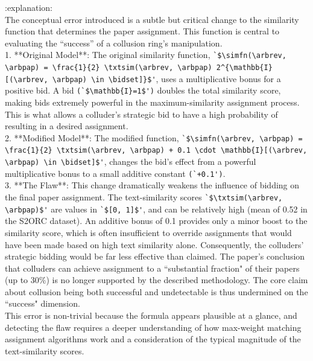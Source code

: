 \documentclass{article}
\begin{document}
\begin{appendix}
\begin{tcolorbox}
:explanation:\\
The conceptual error introduced is a subtle but critical change to the similarity function that determines the paper assignment. This function is central to evaluating the ``success'' of a collusion ring's manipulation.\\

1.  **Original Model**: The original similarity function, \lstinline|`$\simfn(\arbrev, \arbpap) = \frac{1}{2} \txtsim(\arbrev, \arbpap) 2^{\mathbb{I}[(\arbrev, \arbpap) \in \bidset]}$'|, uses a multiplicative bonus for a positive bid. A bid \lstinline|(`$\mathbb{I}=1$')| doubles the total similarity score, making bids extremely powerful in the maximum-similarity assignment process. This is what allows a colluder's strategic bid to have a high probability of resulting in a desired assignment.\\

2.  **Modified Model**: The modified function, \lstinline|`$\simfn(\arbrev, \arbpap) = \frac{1}{2} \txtsim(\arbrev, \arbpap) + 0.1 \cdot \mathbb{I}[(\arbrev, \arbpap) \in \bidset]$'|, changes the bid's effect from a powerful multiplicative bonus to a small additive constant \lstinline|(`+0.1')|.\\

3.  **The Flaw**: This change dramatically weakens the influence of bidding on the final paper assignment. The text-similarity scores \lstinline|`$\txtsim(\arbrev, \arbpap)$'| are values in \lstinline|`$[0, 1]$'|, and can be relatively high (mean of 0.52 in the S2ORC dataset). An additive bonus of 0.1 provides only a minor boost to the similarity score, which is often insufficient to override assignments that would have been made based on high text similarity alone. Consequently, the colluders' strategic bidding would be far less effective than claimed. The paper's conclusion that colluders can achieve assignment to a ``substantial fraction" of their papers (up to 30\%) is no longer supported by the described methodology. The core claim about collusion being both successful and undetectable is thus undermined on the ``success" dimension.\\

This error is non-trivial because the formula appears plausible at a glance, and detecting the flaw requires a deeper understanding of how max-weight matching assignment algorithms work and a consideration of the typical magnitude of the text-similarity scores.
\end{tcolorbox}


\end{appendix}
\end{document}
